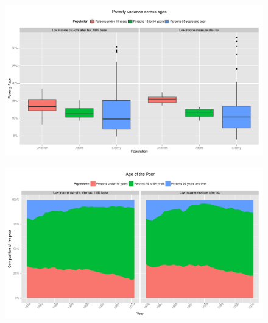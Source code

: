 \documentclass{article}\usepackage[]{graphicx}\usepackage[]{color}
\makeatletter
\def\maxwidth{ %
  \ifdim\Gin@nat@width>\linewidth
    \linewidth
  \else
    \Gin@nat@width
  \fi
}
\newenvironment{knitrout}{}{} %
\makeatother
\begin{document}
\begin{figure}[ht]
\begin{center}
\begin{knitrout}
\color{fgcolor}
\includegraphics[width=\maxwidth]{figure/unnamed-chunk-6} 

\end{knitrout}

\end{center}
\end{figure}
\begin{figure}[ht]
\begin{center}
\begin{knitrout}
\color{fgcolor}
\includegraphics[width=\maxwidth]{figure/unnamed-chunk-7} 

\end{knitrout}

\end{center}
\end{figure}
\end{document}
